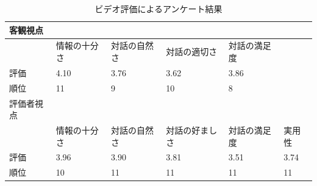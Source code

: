 \begin{table}[hbtp]
    \caption{ビデオ評価によるアンケート結果}
    \label{result_video}
    \centering
    \begin{tabular}{llllll}
    \hline
    客観視点                    &                             &                             &                              &                             &      \\ \hline
    \multicolumn{1}{l|}{}   & \multicolumn{1}{l|}{情報の十分さ} & \multicolumn{1}{l|}{対話の自然さ} & \multicolumn{1}{l|}{対話の適切さ}  & 対話の満足度                      &      \\ \hline
    \multicolumn{1}{l|}{評価} & \multicolumn{1}{l|}{4.10}   & \multicolumn{1}{l|}{3.76}   & \multicolumn{1}{l|}{3.62}    & 3.86                        &      \\ \hline
    \multicolumn{1}{l|}{順位} & \multicolumn{1}{l|}{11}     & \multicolumn{1}{l|}{9}      & \multicolumn{1}{l|}{10}      & 8                           &      \\ \hline
    評価者視点                   &                             &                             &                              &                             &      \\ \hline
    \multicolumn{1}{l|}{}   & \multicolumn{1}{l|}{情報の十分さ} & \multicolumn{1}{l|}{対話の自然さ} & \multicolumn{1}{l|}{対話の好ましさ} & \multicolumn{1}{l|}{対話の満足度} & 実用性  \\ \hline
    \multicolumn{1}{l|}{評価} & \multicolumn{1}{l|}{3.96}   & \multicolumn{1}{l|}{3.90}   & \multicolumn{1}{l|}{3.81}    & \multicolumn{1}{l|}{3.51}   & 3.74 \\ \hline
    \multicolumn{1}{l|}{順位} & \multicolumn{1}{l|}{10}     & \multicolumn{1}{l|}{11}     & \multicolumn{1}{l|}{11}      & \multicolumn{1}{l|}{11}     & 11   \\ \hline
    \end{tabular}
\end{table}
